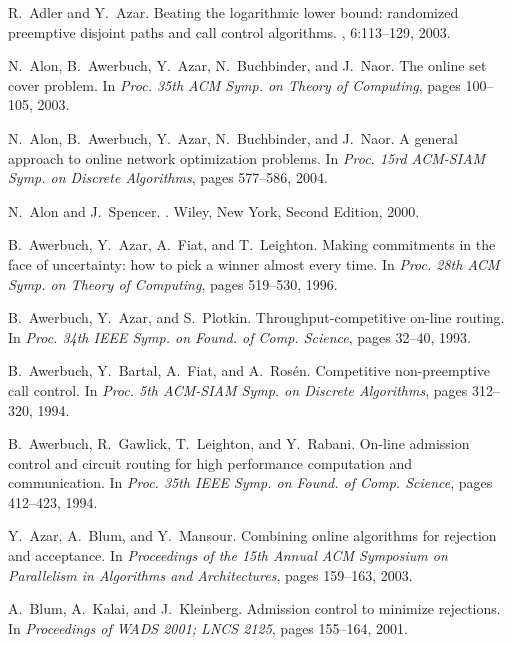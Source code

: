 \documentclass{sig-alternate}
\begin{document}
\begin{thebibliography}{10}

R.~Adler and Y.~Azar.
\newblock Beating the logarithmic lower bound: randomized preemptive disjoint
  paths and call control algorithms.
, 6:113--129, 2003.

N.~Alon, B.~Awerbuch, Y.~Azar, N.~Buchbinder, and J.~Naor.
\newblock The online set cover problem.
\newblock In {\em Proc. 35th ACM Symp. on Theory of Computing}, pages 100--105,
  2003.

N.~Alon, B.~Awerbuch, Y.~Azar, N.~Buchbinder, and J.~Naor.
\newblock A general approach to online network optimization problems.
\newblock In {\em Proc. 15rd ACM-SIAM Symp. on Discrete Algorithms}, pages
  577--586, 2004.

N.~Alon and J.~Spencer.
.
\newblock Wiley, New York, Second Edition, 2000.

B.~Awerbuch, Y.~Azar, A.~Fiat, and T.~Leighton.
\newblock Making commitments in the face of uncertainty: how to pick a winner
  almost every time.
\newblock In {\em Proc. 28th ACM Symp. on Theory of Computing}, pages 519--530,
  1996.

B.~Awerbuch, Y.~Azar, and S.~Plotkin.
\newblock Throughput-competitive on-line routing.
\newblock In {\em Proc. 34th IEEE Symp. on Found. of Comp. Science}, pages
  32--40, 1993.

B.~Awerbuch, Y.~Bartal, A.~Fiat, and A.~Ros\'{e}n.
\newblock Competitive non-preemptive call control.
\newblock In {\em Proc. 5th ACM-SIAM Symp. on Discrete Algorithms}, pages
  312--320, 1994.

B.~Awerbuch, R.~Gawlick, T.~Leighton, and Y.~Rabani.
\newblock On-line admission control and circuit routing for high performance
  computation and communication.
\newblock In {\em Proc. 35th IEEE Symp. on Found. of Comp. Science}, pages
  412--423, 1994.

Y.~Azar, A.~Blum, and Y.~Mansour.
\newblock Combining online algorithms for rejection and acceptance.
\newblock In {\em Proceedings of the 15th Annual {ACM} Symposium on Parallelism
  in Algorithms and Architectures}, pages 159--163, 2003.

A.~Blum, A.~Kalai, and J.~Kleinberg.
\newblock Admission control to minimize rejections.
\newblock In {\em Proceedings of WADS 2001; LNCS 2125}, pages 155--164, 2001.


\end{thebibliography}
\end{document}
